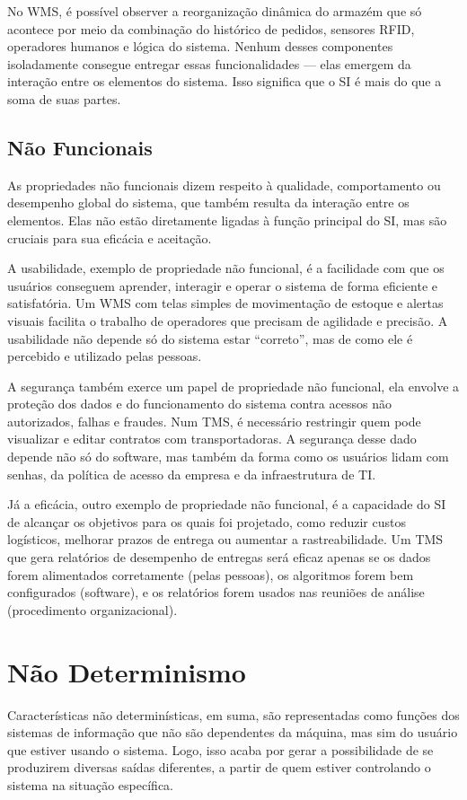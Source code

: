 \documentclass[conference]{IEEEtran}
\begin{document}
No WMS, é possível observer a reorganização dinâmica do armazém que só acontece por meio da combinação do histórico de pedidos, sensores RFID, operadores humanos e lógica do sistema. Nenhum desses componentes isoladamente consegue entregar essas funcionalidades — elas emergem da interação entre os elementos do sistema. Isso significa que o SI é mais do que a soma de suas partes.
\subsection{Não Funcionais}
As propriedades não funcionais dizem respeito à qualidade, comportamento ou desempenho global do sistema, que também resulta da interação entre os elementos. Elas não estão diretamente ligadas à função principal do SI, mas são cruciais para sua eficácia e aceitação.

A usabilidade, exemplo de propriedade não funcional, é a facilidade com que os usuários conseguem aprender, interagir e operar o sistema de forma eficiente e satisfatória. Um WMS com telas simples de movimentação de estoque e alertas visuais facilita o trabalho de operadores que precisam de agilidade e precisão. A usabilidade não depende só do sistema estar “correto”, mas de como ele é percebido e utilizado pelas pessoas.

A segurança também exerce um papel de propriedade não funcional, ela envolve a proteção dos dados e do funcionamento do sistema contra acessos não autorizados, falhas e fraudes. Num TMS, é necessário restringir quem pode visualizar e editar contratos com transportadoras. A segurança desse dado depende não só do software, mas também da forma como os usuários lidam com senhas, da política de acesso da empresa e da infraestrutura de TI.

Já a eficácia, outro exemplo de propriedade não funcional, é a capacidade do SI de alcançar os objetivos para os quais foi projetado, como reduzir custos logísticos, melhorar prazos de entrega ou aumentar a rastreabilidade. Um TMS que gera relatórios de desempenho de entregas será eficaz apenas se os dados forem alimentados corretamente (pelas pessoas), os algoritmos forem bem configurados (software), e os relatórios forem usados nas reuniões de análise (procedimento organizacional).

\section{Não Determinismo}
Características não determinísticas, em suma, são representadas como funções dos sistemas de informação que não são dependentes da máquina, mas sim do usuário que estiver usando o sistema. Logo, isso acaba por gerar a possibilidade de se produzirem diversas saídas diferentes, a partir de quem estiver controlando o sistema na situação específica.
\end{document}
